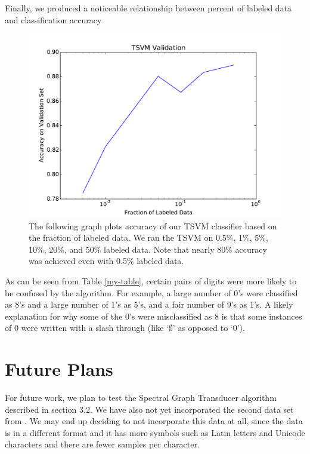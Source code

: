 \documentclass[11pt]{article}
\begin{document}
Finally, we produced a noticeable relationship between percent of labeled data and classification accuracy \par

\begin{figure}
  \centering
  \caption{The following graph plots accuracy of our TSVM classifier based on the fraction of labeled data. We ran the TSVM on 0.5\%, 1\%, 5\%, 10\%, 20\%, and 50\% labeled data. Note that nearly 80\% accuracy was achieved even with 0.5\% labeled data.}
  \includegraphics[width=5in]{tsvm.pdf}
\end{figure}


As can be seen from Table \ref{my-table}, certain pairs of digits were more likely to be confused by the algorithm. For example, a large number of 0's were classified as 8's and a large number of 1's as 5's, and a fair number of 9's as 1's. A likely explanation for why
some of the 0's were misclassified as 8 is that some instances of 0 were written with a slash through (like `$\emptyset$' as opposed to `0').

\section{Future Plans}

For future work, we plan to test the Spectral Graph Transducer algorithm described in section 3.2. We have also not yet incorporated the second data set from \cite{Llorens:2008}. We may end up deciding to not incorporate this data at all, since the data is in a different format and it has more symbols such as Latin letters and Unicode characters and there are fewer samples per character.
\end{document}
